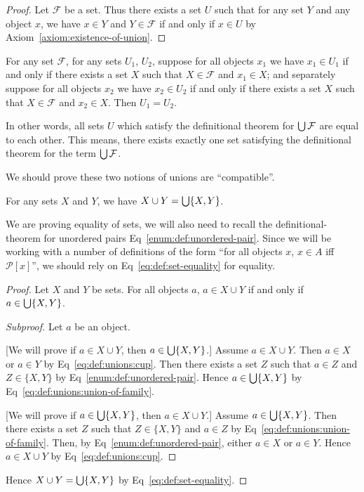 \begin{proof}
Let $\mathcal{F}$ be a set. Thus there exists a set $U$ such that for any
set $Y$ and any object $x$, we have $x\in Y$ and $Y\in\mathcal{F}$ if
and only if $x\in U$ by Axiom~\ref{axiom:existence-of-union}.
\end{proof}

\begin{theorem}[Uniqueness]
For any set $\mathcal{F}$,
  for any sets $U_{1}$, $U_{2}$,
suppose for all objects $x_{1}$ we have $x_{1}\in U_{1}$ if and only if
there exists a set $X$ such that $X\in\mathcal{F}$ and $x_{1}\in X$;
and separately suppose for all objects $x_{2}$ we have $x_{2}\in U_{2}$
if and only if there exists a set $X$ such that $X\in\mathcal{F}$ and
$x_{2}\in X$. Then $U_{1}=U_{2}$.
\end{theorem}

In other words, all sets $U$ which satisfy the definitional theorem for
$\bigcup\mathcal{F}$ are equal to each other. This means, there exists
exactly one set satisfying the definitional theorem for the term
$\bigcup\mathcal{F}$. 

We should prove these two notions of unions are ``compatible''.
\begin{proposition}\label{prop:unions:compatible}
For any sets $X$ and $Y$, we have $X\cup Y=\bigcup\{X,Y\}$.
\end{proposition}

We are proving equality of sets, we will also need to recall the
definitional-theorem for unordered pairs Eq~\eqref{enum:def:unordered-pair}.
Since we will be working with a number of definitions of the form ``for
all objects $x$, $x\in A$ iff $\mathcal{P}[x]$'', we should rely on
Eq~\eqref{eq:def:set-equality} for equality.

\begin{proof}
Let $X$ and $Y$ be sets.
For all objects $a$, $a\in X\cup Y$ if and only if $a\in\bigcup\{X,Y\}$.
\begin{proof}[Subproof]
Let $a$ be an object.

[We will prove if $a\in X\cup Y$, then $a\in\bigcup\{X,Y\}$.]
Assume $a\in X\cup Y$. Then $a\in X$ or $a\in Y$ by Eq~\eqref{eq:def:unions:cup}. Then there exists a
set $Z$ such that $a\in Z$ and $Z\in\{X,Y\}$ by Eq~\eqref{enum:def:unordered-pair}.
Hence $a\in\bigcup\{X,Y\}$ by Eq~\eqref{eq:def:unions:union-of-family}.

[We will prove if $a\in\bigcup\{X,Y\}$, then $a\in X\cup Y$.]
Assume $a\in\bigcup\{X,Y\}$. Then there exists a set $Z$ such that
$Z\in\{X,Y\}$ and $a\in Z$ by Eq~\eqref{eq:def:unions:union-of-family}. Then, by Eq~\eqref{enum:def:unordered-pair},
either $a\in X$ or $a\in Y$. Hence $a\in X\cup Y$ by Eq~\eqref{eq:def:unions:cup}.
\end{proof}
\noindent Hence $X\cup Y=\bigcup\{X,Y\}$ by Eq~\eqref{eq:def:set-equality}.
\end{proof}
